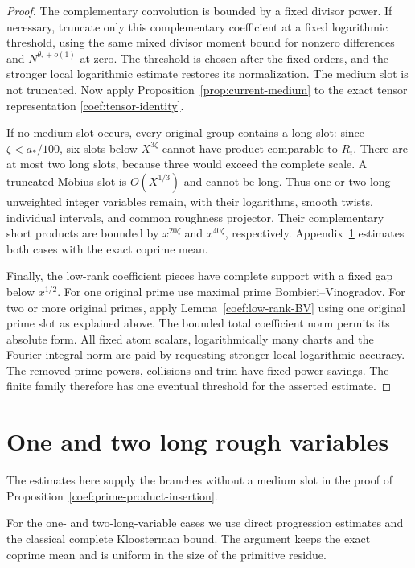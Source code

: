 \begin{proof}
The complementary convolution is bounded by a fixed divisor power.
If necessary, truncate only this complementary coefficient at a fixed
logarithmic threshold, using the same mixed divisor moment bound for
nonzero differences and $N^{\theta_*+o(1)}$ at zero.  The threshold is
chosen after the fixed orders, and the stronger local logarithmic
estimate restores its normalization.  The medium slot is not truncated.
Now apply Proposition~\ref{prop:current-medium} to the exact tensor
representation \eqref{coef:tensor-identity}.

If no medium slot occurs, every original group contains a long
slot: since $\zeta<a_*/100$, six slots below $X^{3\zeta}$ cannot
have product comparable to $R_i$. There are at most two long slots,
because three would exceed the complete scale. A truncated M\"obius
slot is $O(X^{1/3})$ and cannot be long. Thus one or two long
unweighted integer variables remain, with their logarithms, smooth
twists, individual intervals, and common roughness projector.
Their complementary short products are bounded by $x^{20\zeta}$
and $x^{40\zeta}$, respectively. Appendix~\ref{app:brun} estimates
both cases with the exact coprime mean.

Finally, the low-rank coefficient pieces have complete support with a
fixed gap below $x^{1/2}$.  For one original prime use maximal prime
Bombieri--Vinogradov.  For two or more original primes, apply
Lemma~\ref{coef:low-rank-BV} using one original prime slot as explained
above.  The bounded total coefficient norm permits its absolute
form.  All fixed atom scalars, logarithmically many charts and the
Fourier integral norm are paid by requesting stronger local logarithmic
accuracy.  The removed prime powers, collisions and trim have fixed
power savings.  The finite family therefore has one eventual threshold
for the asserted estimate.
\end{proof}

\section{One and two long rough variables}
\label{app:brun}

The estimates here supply the branches without a medium slot in the proof of Proposition~\ref{coef:prime-product-insertion}.

For the one- and two-long-variable cases we use direct progression
estimates and the classical complete Kloosterman bound.
The argument keeps the exact coprime mean and is uniform in the
size of the primitive residue.


